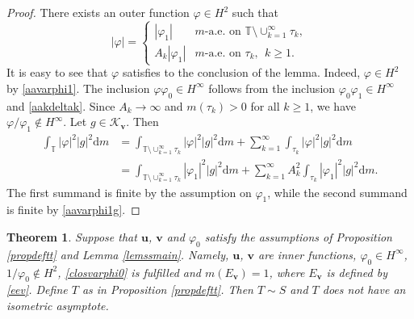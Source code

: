 \documentclass[a4paper,oneside,11pt]{amsart}
\numberwithin{equation}{section}
\theoremstyle{plain}
\newtheorem{theorem}{Theorem}[section]
\theoremstyle{definition}
\begin{document}
\begin{proof}
There exists an outer function $\varphi\in H^2$ such that $$|\varphi|=\begin{cases} |\varphi_1| & m\text{-a.e. on } 
\mathbb T\setminus\cup_{k=1}^\infty \tau_k, \\ 
A_k|\varphi_1|&  m\text{-a.e. on } \tau_k, \ \ k\geq 1.\end{cases}$$ 
It is easy to see that $\varphi$ satisfies to the conclusion of the lemma. 
Indeed, $\varphi\in H^2$ by \eqref{aavarphi1}. 
The inclusion $\varphi\varphi_0\in H^\infty$ follows from   the inclusion $\varphi_0\varphi_1\in H^\infty$ and \eqref{aakdeltak}. Since $A_k\to\infty$ and  $m(\tau_k)>0$ for all $k\geq 1$, we have 
$\varphi/\varphi_1\not\in H^\infty$. 
Let $g\in\mathcal K_{\mathbf v}$. Then
\begin{equation*}\begin{aligned}\int_{\mathbb T}|\varphi|^2|g|^2{\mathrm d}m &
 =\int_{\mathbb T\setminus\cup_{k=1}^\infty \tau_k}|\varphi|^2|g|^2{\mathrm d}m+
\sum_{k=1}^\infty \int_{\tau_k}|\varphi|^2|g|^2{\mathrm d}m\\&=
\int_{\mathbb T\setminus\cup_{k=1}^\infty \tau_k}|\varphi_1|^2|g|^2{\mathrm d}m+
\sum_{k=1}^\infty A_k^2 \int_{\tau_k}|\varphi_1|^2|g|^2{\mathrm d}m.\end{aligned}\end{equation*}
The first summand is finite by the assumption on $\varphi_1$, while the second summand is finite by \eqref{aavarphi1g}.
\end{proof}

\begin{theorem} \label{thmssmain} Suppose that ${\mathbf u}$, ${\mathbf v}$ and $\varphi_0$ satisfy the assumptions of Proposition 
\ref{propdeftt} and Lemma \ref{lemssmain}. Namely, ${\mathbf u}$, ${\mathbf v}$ are inner functions, $\varphi_0\in H^\infty$, 
$1/\varphi_0\not\in H^2$, \eqref{closvarphi0} is fulfilled and $m(E_{\mathbf v})=1$, where $E_{\mathbf v}$ is defined by 
\eqref{eev}. Define $T$ as in Proposition  \ref{propdeftt}. Then $T\sim S$ and $T$ does not have an isometric asymptote.
\end{theorem}
\end{document}
